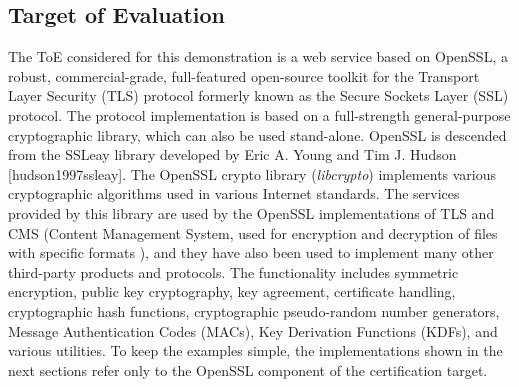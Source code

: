 \subsection{Target of Evaluation}
The ToE considered for this demonstration is a web service based on OpenSSL, a robust, commercial-grade, full-featured open-source toolkit for the Transport Layer Security (TLS) protocol formerly known as the Secure Sockets Layer (SSL) protocol. The protocol implementation is based on a full-strength general-purpose cryptographic library, which can also be used stand-alone.
OpenSSL is descended from the SSLeay library developed by Eric A. Young and Tim J. Hudson [hudson1997ssleay]. The OpenSSL crypto library (\textit{libcrypto}) implements various cryptographic algorithms used in various Internet standards. The services provided by this library are used by the OpenSSL implementations of TLS and CMS (Content Management System, used for encryption and decryption of files with specific formats \cite{mckeever2003understanding}), and they have also been used to implement many other third-party products and protocols.
The functionality includes symmetric encryption, public key cryptography, key agreement, certificate handling, cryptographic hash functions, cryptographic pseudo-random number generators, Message Authentication Codes (MACs), Key Derivation Functions (KDFs), and various utilities. To keep the examples simple, the implementations shown in the next sections refer only to the OpenSSL component of the certification target.

